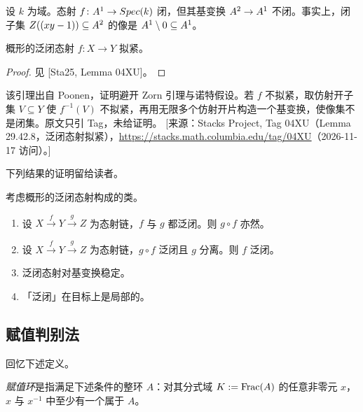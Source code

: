 \begin{example}\label{ex:24.2.2}
设 $k$ 为域。态射 $f\colon A^1 \to Spec(k)$ 闭，但其基变换 $A^2 \to A^1$ 不闭。事实上，闭子集 $Z((xy-1)) \subseteq A^2$ 的像是 $A^1 \setminus 0 \subseteq A^1$。
\end{example}

\begin{lemma}\label{lem:24.2.3}
概形的泛闭态射 $f\colon X \to Y$ 拟紧。
\end{lemma}

\begin{proof}
见 [Sta25, Lemma 04XU]。
\end{proof}

\begin{yizhu}
该引理出自 Poonen，证明避开 Zorn 引理与诺特假设。若 $f$ 不拟紧，取仿射开子集 $V \subseteq Y$ 使 $f^{-1}(V)$ 不拟紧，再用无限多个仿射开片构造一个基变换，使像集不是闭集。原文只引 Tag，未给证明。
[来源：Stacks Project, Tag 04XU（Lemma 29.42.8，泛闭态射拟紧），\url{https://stacks.math.columbia.edu/tag/04XU}（2026-11-17 访问）。]
\end{yizhu}

下列结果的证明留给读者。

\begin{lemma}\label{lem:24.2.4}
考虑概形的泛闭态射构成的类。
\begin{enumerate}[label=(\roman*),leftmargin=2em,itemsep=0.25ex]
  \item 设 $X \xrightarrow{f} Y \xrightarrow{g} Z$ 为态射链，$f$ 与 $g$ 都泛闭。则 $g \circ f$ 亦然。
  \item 设 $X \xrightarrow{f} Y \xrightarrow{g} Z$ 为态射链，$g \circ f$ 泛闭且 $g$ 分离。则 $f$ 泛闭。
  \item 泛闭态射对基变换稳定。
  \item 「泛闭」在目标上是局部的。
\end{enumerate}
\end{lemma}

\subsection{赋值判别法}\label{sec:24.3}

回忆下述定义。

\begin{definition}\label{def:24.3.1}
\emph{赋值环}是指满足下述条件的整环 $A$：对其分式域 $K := \operatorname{Frac}(A)$ 的任意非零元 $x$，$x$ 与 $x^{-1}$ 中至少有一个属于 $A$。
\end{definition}

